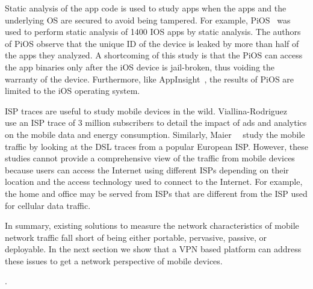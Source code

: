 Static analysis of the app code is used to study apps when the apps and the underlying OS are secured to avoid being tampered. 
For example, PiOS~\cite{egele:pios} was used to perform static analysis of 1400 IOS apps by static analysis. 
The authors of PiOS observe that the unique ID of the device is leaked by more than half of the apps they analyzed. 
A shortcoming of this study is that the PiOS can access the app binaries only after the iOS device is jail-broken, thus voiding the warranty of the device.
Furthermore, like AppInsight~\cite{ravindranath:appinsight}, the results of PiOS are limited to the iOS operating system. 

ISP traces are useful to study mobile devices in the wild. 
Viallina-Rodriguez~\etal~\cite{vallina-rod:ads} use an ISP trace of 3 million subscribers to detail the impact of ads and analytics on the mobile data and energy consumption. 
Similarly, Maier~\etal~\cite{maier:mobtraffic} study the mobile traffic by looking at the DSL traces from a popular European ISP. 
However, these studies cannot provide a comprehensive view of the traffic from mobile devices because users can access the Internet using different ISPs depending on their location and the access technology used to connect to the Internet. 
For example, the home \wifi and office \wifi may be served from ISPs that are different from the ISP used for cellular data traffic. 

In summary, existing solutions to measure the network characteristics of mobile network traffic fall short of being either portable, pervasive, passive, or deployable. 
In the next section we show that a VPN based platform can address these issues to get a network perspective of mobile devices.  

.
